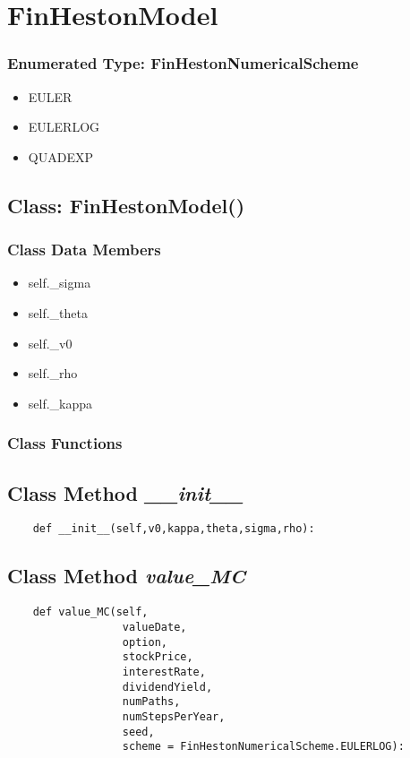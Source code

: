 \documentclass[twoside,11pt]{book}
\begin{document}
\newpage
\section{FinHestonModel}

\subsubsection{Enumerated Type: FinHestonNumericalScheme}
\begin{itemize}
\item{EULER}
\item{EULERLOG}
\item{QUADEXP}
\end{itemize}

\subsection{Class: FinHestonModel()}


\subsubsection{Class Data Members}
\begin{itemize}
\item{self.\_sigma}
\item{self.\_theta}
\item{self.\_v0}
\item{self.\_rho}
\item{self.\_kappa}
\end{itemize}

\subsubsection{Class Functions}

\subsection{Class Method {\it \_\_init\_\_}}


\begin{lstlisting}
    def __init__(self,v0,kappa,theta,sigma,rho):
\end{lstlisting}

\subsection{Class Method {\it value\_MC}}


\begin{lstlisting}
    def value_MC(self,
                  valueDate,
                  option,
                  stockPrice,
                  interestRate,
                  dividendYield,
                  numPaths,
                  numStepsPerYear,
                  seed, 
                  scheme = FinHestonNumericalScheme.EULERLOG):
\end{lstlisting}
\end{document}
